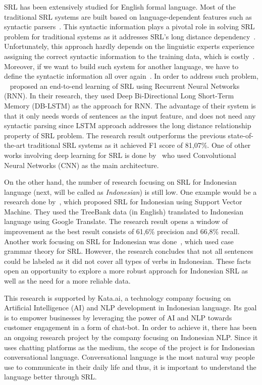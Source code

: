 SRL has been extensively studied for English formal language. Most of the traditional SRL systems are built based on language-dependent features such as syntactic parsers~\citep{gildea2002automatic, gildea2002necessity, pradhan2005semantic}. This syntactic information plays a pivotal role in solving SRL problem for traditional systems as it addresses SRL's long distance dependency~\citep{zhou2015end}. Unfortunately, this approach hardly depends on the linguistic experts experience assigning the correct syntactic information to the training data, which is costly~\citep{zhou2015end}. Moreover, if we want to build such system for another language, we have to define the syntactic information all over again~\citep{zhou2015end}. In order to address such problem, ~\cite{zhou2015end} proposed an end-to-end learning of SRL using Recurrent Neural Networks (RNN). In their research, they used Deep Bi-Directional Long Short-Term Memory (DB-LSTM) as the approach for RNN. The advantage of their system is that it only needs words of sentences as the input feature, and does not need any syntactic parsing since LSTM approach addresses the long distance relationship property of SRL problem. The research result outperforms the previous state-of-the-art traditional SRL systems as it achieved F1 score of 81,07\%. One of other works involving deep learning for SRL is done by~\cite{collobert2011natural} who used Convolutional Neural Networks (CNN) as the main architecture.

On the other hand, the number of research focusing on SRL for Indonesian language (next, will be called as \textit{Indonesian}) is still low. One example would be a research done by~\cite{skripsidewi}, which proposed SRL for Indonesian using Support Vector Machine. They used the TreeBank data (in English) translated to Indonesian language using Google Translate. The research result opens a window of improvement as the best result consists of 61,6\% precision and 66,8\% recall. Another work focusing on SRL for Indonesian was done~\cite{skripsinur}, which used case grammar theory for SRL. However, the research concludes that not all sentences could be labeled as it did not cover all types of verbs in Indonesian. These facts open an opportunity to explore a more robust approach for Indonesian SRL as well as the need for a more reliable data.

This research is supported by Kata.ai, a technology company focusing on Artificial Intelligence (AI) and NLP development in Indonesian language. Its goal is to empower businesses by leveraging the power of AI and NLP towards customer engagement in a form of chat-bot. In order to achieve it, there has been an ongoing research project by the company focusing on Indonesian NLP. Since it uses chatting platforms as the medium, the scope of the project is for Indonesian conversational language. Conversational language is the most natural way people use to communicate in their daily life and thus, it is important to understand the language better through SRL.

